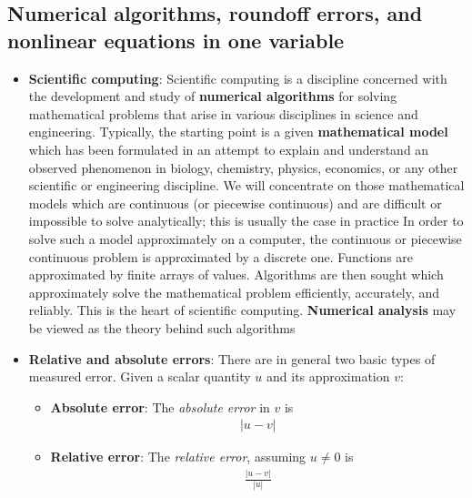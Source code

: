 \documentclass{report}
\begin{document}
    \pagebreak 
    \subsection{Numerical algorithms, roundoff errors, and nonlinear equations in one variable}
    \begin{itemize}
        \item \textbf{Scientific computing}: Scientific computing is a discipline concerned with the development and study of \textbf{numerical algorithms} for solving mathematical problems that arise in various disciplines in science and engineering.
            \bigbreak \noindent 
            Typically, the starting point is a given \textbf{mathematical model} which has been formulated in an attempt to explain and understand an observed phenomenon in biology, chemistry, physics, economics, or any other scientific or engineering discipline. We will concentrate on those mathematical models which are continuous (or piecewise continuous) and are difficult or impossible to solve analytically; this is usually the case in practice
            \bigbreak \noindent 
            In order to solve such a model approximately on a computer, the continuous or piecewise continuous problem is approximated by a discrete one. Functions are approximated by finite arrays of values. Algorithms are then sought which approximately solve the mathematical problem efficiently, accurately, and reliably. This is the heart of scientific computing. \textbf{Numerical analysis} may be viewed as the theory behind such algorithms
            \bigbreak \noindent 
        \item \textbf{Relative and absolute errors}: There are in general two basic types of measured error. Given a scalar quantity $u$ and its approximation $v$:
            \begin{itemize}
                \item \textbf{Absolute error}: The \textit{absolute error} in $v$ is 
                    \begin{align*}
                        \left\lvert u - v \right\rvert
                    \end{align*}
                \item \textbf{Relative error}: The \textit{relative error}, assuming $u\ne 0$ is 
                    \begin{align*}
                        \frac{\left\lvert u-v \right\rvert}{\left\lvert u \right\rvert}

\end{align*}
\end{itemize}
\end{itemize}
\end{document}
